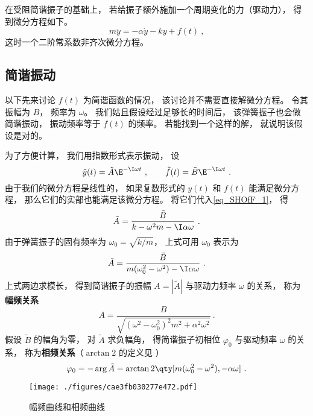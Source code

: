 

在受阻简谐振子的基础上， 若给振子额外施加一个周期变化的力（驱动力）， 得到微分方程如下。
\begin{equation}\label{eq_SHOfF_1}
m\ddot y = -\alpha \dot y - ky + f(t)~,
\end{equation}
这时一个二阶常系数非齐次微分方程。

\subsection{简谐振动}
以下先来讨论 $f(t)$ 为简谐函数的情况， 该讨论并不需要直接解微分方程。 令其振幅为 $B$， 频率为 $\omega$。 我们姑且假设经过足够长的时间后， 该弹簧振子也会做简谐振动， 振动频率等于 $f(t)$ 的频率。 若能找到一个这样的解， 就说明该假设是对的。

为了方便计算， 我们用指数形式表示振动， 设
\begin{equation}
\tilde y(t) = \tilde A\E^{-\I\omega t} ~,\qquad
\tilde f(t) = \tilde B\E^{-\I \omega t}~.
\end{equation}
由于我们的微分方程是线性的， 如果复数形式的 $y(t)$ 和 $f(t)$ 能满足微分方程， 那么它们的实部也能满足该微分方程。 将它们代入\autoref{eq_SHOfF_1}， 得
\begin{equation}
\tilde A =  \frac{\tilde B}{k -\omega^2 m - \I\alpha\omega}~.
\end{equation}
由于弹簧振子的固有频率为 $\omega_0 = \sqrt{k/m}$， 上式可用 $\omega_0$ 表示为
\begin{equation}
\tilde A = \frac{\tilde B}{m(\omega_0^2 - \omega^2) - \I\alpha\omega}~.
\end{equation}
上式两边求模长， 得到简谐振子的振幅 $A = |\tilde A|$ 与驱动力频率 $\omega$ 的关系， 称为\textbf{幅频关系}
\begin{equation}\label{eq_SHOfF_5}
A = \frac{B}{\sqrt{(\omega^2 - \omega_0^2)^2 m^2 + \alpha^2\omega^2}}~.
\end{equation}
假设 $\tilde B$ 的幅角为零， 对 $\tilde A$ 求负幅角， 得简谐振子初相位 $\varphi_0$ 与驱动频率 $\omega$ 的关系， 称为\textbf{相频关系}（$\arctan2$ 的定义见%
）
\begin{equation}\label{eq_SHOfF_6}
\varphi_0 = -\arg \tilde A = \arctan2 \qty[m(\omega_0^2 - \omega^2), -\alpha\omega]~.
\end{equation}

\begin{figure}[ht]
\centering
\texttt{[image: ./figures/cae3fb030277e472.pdf]}
\caption{幅频曲线和相频曲线} \label{fig_SHOfF_1}
\end{figure}

